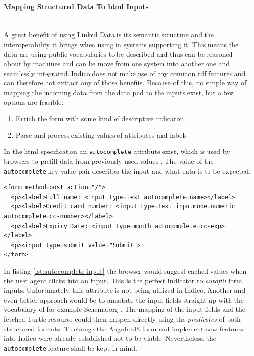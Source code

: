 \paragraph{Mapping Structured Data To \gls{html} Inputs}\mbox{}\\

A great benefit of using Linked Data is its semantic structure and the interoperability it brings when using in systems supporting it. This means the data are using public vocabularies to be described and thus can be reasoned about by machines and can be move from one system into another one and seamlessly integrated. Indico does not make use of any common \gls{rdf} features and can therefore not extract any of those benefits. Because of this, no simple way of mapping the incoming data from the data pod to the inputs exist, but a few options are feasible.

\begin{enumerate}
    \item Enrich the form with some kind of descriptive indicator
    \item Parse and process existing values of attributes and labels
\end{enumerate}

In the \gls{html} specification an \texttt{autocomplete} attribute exist, which is used by browsers to prefill data from previously used values \cite{html-spec}. The value of the \texttt{autocomplete} key-value pair describes the input and what data is to be expected.

\begin{lstlisting}[language=Other,columns=fullflexible, caption={Autocomplete attribute on input field}, label={lst:autocomplete-input}]
<form method=post action="/">
  <p><label>Full name: <input type=text autocomplete=name></label>
  <p><label>Credit card number: <input type=text inputmode=numeric autocomplete=cc-number></label>
  <p><label>Expiry Date: <input type=month autocomplete=cc-exp></label>
  <p><input type=submit value="Submit">
</form>
\end{lstlisting}

In listing \ref{lst:autocomplete-input} the browser would suggest cached values when the user agent clicks into an input. This is the perfect indicator to \textit{autofill} form inputs. Unfortunately, this attribute is not being utilized in Indico. Another and even better approach would be to annotate the input fields straight up with the vocabulary of for example Schema.org \cite{schema-org}. The mapping of the input fields and the fetched Turtle resource could then happen directly using the \textit{predicates} of both structured formats. To change the AngularJS form and implement new features into Indico were already established not to be viable. Nevertheless, the \texttt{autocomplete} feature shall be kept in mind.

